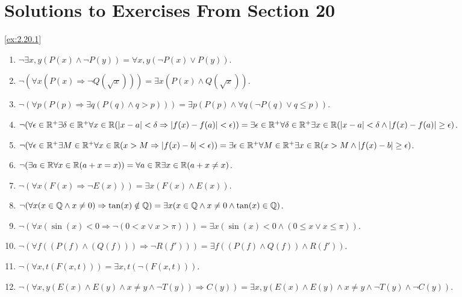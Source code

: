 \section*{Solutions to Exercises From Section 20}

\begin{solution}\label{sol:2.20.1}\ref{ex:2.20.1}
    \begin{enumerate}
        \item $\neg\exists x,y(P(x)\land \neg P(y))=\forall x,y(\neg P(x)\lor P(y))$.
        \item $\neg(\forall x(P(x)\Rightarrow \neg Q(\sqrt{x})))=\exists x(P(x)\land Q(\sqrt{x}))$.
        \item $\neg(\forall p(P(p)\Rightarrow \exists q(P(q)\land q>p)))=\exists p(P(p)\land \forall q(\neg P(q)\lor q \le p))$.
        \item $\neg(\forall \epsilon\in\mathbb{R}^{+}\exists\delta\in\mathbb{R}^{+}\forall x\in\mathbb{R}(\lvert x-a \rvert<\delta\Rightarrow \lvert f(x)-f(a) \rvert<\epsilon))=\exists \epsilon\in\mathbb{R}^{+}\forall \delta\in\mathbb{R}^{+}\exists x\in\mathbb{R}(\lvert x-a \rvert<\delta \land \lvert f(x)-f(a) \rvert\ge \epsilon)$.
        \item $\neg(\forall \epsilon \in \mathbb{R}^{+}\exists M\in\mathbb{R}^{+}\forall x\in\mathbb{R}(x>M\Rightarrow\lvert f(x)-b \rvert<\epsilon))=\exists\epsilon\in\mathbb{R}^{+}\forall M\in\mathbb{R}^{+}\exists x\in\mathbb{R}(x>M\land \lvert f(x)-b \rvert\ge \epsilon)$.
        \item $\neg(\exists a\in\mathbb{R}\forall x\in\mathbb{R}(a+x=x))=\forall a\in\mathbb{R}\exists x\in\mathbb{R}(a+x\ne x)$. 
        \item $\neg(\forall x(F(x)\Rightarrow \neg E(x)))=\exists x(F(x)\land E(x))$. 
        \item $\neg(\forall x(x\in \mathbb{Q}\land x\ne 0)\Rightarrow \tan(x)\notin\mathbb{Q})=\exists x(x\in\mathbb{Q}\land x\ne 0\land \tan(x)\in\mathbb{Q})$.
        \item $\neg(\forall x(\sin(x)<0\Rightarrow\neg(0 < x \lor x> \pi)))=\exists x(\sin(x)<0\land (0\le x\lor x \le \pi))$.
        \item $\neg(\forall f((P(f)\land(Q(f)))\Rightarrow \neg R(f')))=\exists f((P(f)\land Q(f))\land R(f'))$. 
        \item $\neg(\forall x,t(F(x,t)))=\exists x,t(\neg(F(x,t)))$.
        \item $\neg(\forall x,y(E(x)\land E(y)\land x\ne y\land \neg T(y))\Rightarrow C(y))=\exists x,y(E(x)\land E(y)\land x\ne y\land \neg T(y) \land \neg C(y))$.
    \end{enumerate}
\end{solution}